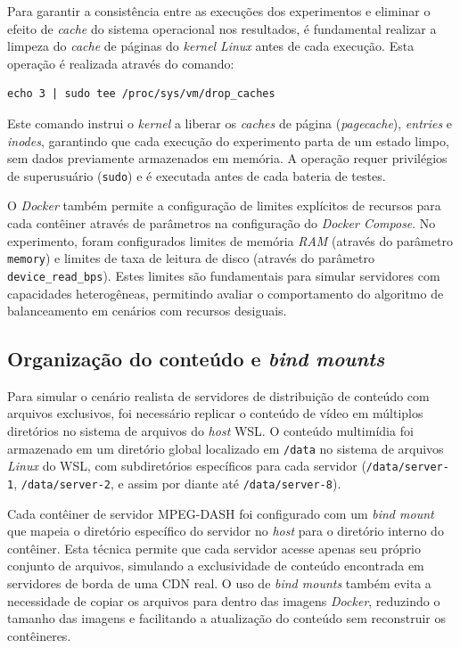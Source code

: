 Para garantir a consistência entre as execuções dos experimentos e eliminar o efeito de \textit{cache} do sistema operacional nos resultados, é fundamental realizar a limpeza do \textit{cache} de páginas do \textit{kernel} \textit{Linux} antes de cada execução. Esta operação é realizada através do comando:

\begin{verbatim}
echo 3 | sudo tee /proc/sys/vm/drop_caches
\end{verbatim}

Este comando instrui o \textit{kernel} a liberar os \textit{caches} de página (\textit{pagecache}), \textit{entries} e \textit{inodes}, garantindo que cada execução do experimento parta de um estado limpo, sem dados previamente armazenados em memória. A operação requer privilégios de superusuário (\texttt{sudo}) e é executada antes de cada bateria de testes.

O \textit{Docker} também permite a configuração de limites explícitos de recursos para cada contêiner através de parâmetros na configuração do \textit{Docker Compose}. No experimento, foram configurados limites de memória \textit{RAM} (através do parâmetro \texttt{memory}) e limites de taxa de leitura de disco (através do parâmetro \texttt{device\_read\_bps}). Estes limites são fundamentais para simular servidores com capacidades heterogêneas, permitindo avaliar o comportamento do algoritmo de balanceamento em cenários com recursos desiguais.

\subsection{Organização do conteúdo e \textit{bind mounts}}

Para simular o cenário realista de servidores de distribuição de conteúdo com arquivos exclusivos, foi necessário replicar o conteúdo de vídeo em múltiplos diretórios no sistema de arquivos do \textit{host} WSL. O conteúdo multimídia foi armazenado em um diretório global localizado em \texttt{/data} no sistema de arquivos \textit{Linux} do WSL, com subdiretórios específicos para cada servidor (\texttt{/data/server-1}, \texttt{/data/server-2}, e assim por diante até \texttt{/data/server-8}).

Cada contêiner de servidor MPEG-DASH foi configurado com um \textit{bind mount} que mapeia o diretório específico do servidor no \textit{host} para o diretório interno do contêiner. Esta técnica permite que cada servidor acesse apenas seu próprio conjunto de arquivos, simulando a exclusividade de conteúdo encontrada em servidores de borda de uma CDN real. O uso de \textit{bind mounts} também evita a necessidade de copiar os arquivos para dentro das imagens \textit{Docker}, reduzindo o tamanho das imagens e facilitando a atualização do conteúdo sem reconstruir os contêineres.

